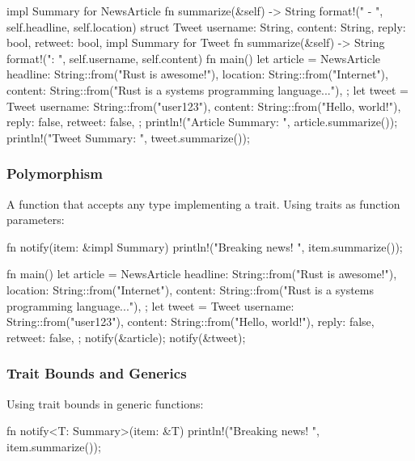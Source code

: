 \documentclass[8pt,a4paper,twocolumn]{extarticle}
\begin{document}
\begin{Code}
\begin{Code}
  impl Summary for NewsArticle {
      fn summarize(&self) -> String {
          format!("{} - {}", self.headline, self.location)
      }
  }
  struct Tweet {
      username: String,
      content: String,
      reply: bool,
      retweet: bool,
  }
  impl Summary for Tweet {
      fn summarize(&self) -> String {
          format!("{}: {}", self.username, self.content)
      }
  }
  fn main() {
      let article = NewsArticle {
          headline: String::from("Rust is awesome!"),
          location: String::from("Internet"),
          content: String::from("Rust is a systems programming language..."),
      };
      let tweet = Tweet {
          username: String::from("user123"),
          content: String::from("Hello, world!"),
          reply: false,
          retweet: false,
      };
      println!("Article Summary: {}", article.summarize());
      println!("Tweet Summary: {}", tweet.summarize());
  }
\end{Code}

\subsubsection{Polymorphism}

A function that accepts any type implementing a trait.
Using traits as function parameters:

\begin{Code}
  fn notify(item: &impl Summary) {
      println!("Breaking news! {}", item.summarize());
  }

  fn main() {
      let article = NewsArticle {
          headline: String::from("Rust is awesome!"),
          location: String::from("Internet"),
          content: String::from("Rust is a systems programming language..."),
      };
      let tweet = Tweet {
          username: String::from("user123"),
          content: String::from("Hello, world!"),
          reply: false,
          retweet: false,
      };
      notify(&article);
      notify(&tweet);
  }
\end{Code}

\subsubsection{Trait Bounds and Generics}

Using trait bounds in generic functions:
\begin{Code}
  fn notify<T: Summary>(item: &T) {
      println!("Breaking news! {}", item.summarize());
  }
\end{Code}



\end{Code}
\end{document}
